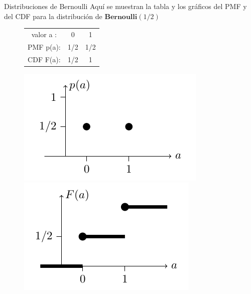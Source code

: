 \documentclass[10pt]{beamer}
\begin{document}
\begin{frame}{Distribuciones de Bernoulli}
Aqu\'i se muestran  la tabla y los gr\'aficos del PMF y del CDF para la distribuci\'on de $\textbf{Bernoulli} (1/2)$ 

\begin{figure}
	\centering
	\begin{minipage}{.5\textwidth}
	\begin{table}[]
		\centering
		\begin{tabular}{ccc}
			valor  a  :    & 0    & 1    \\
			PMF   p(a): & 1/2 & 1/2     \\
			CDF   F(a):& 1/2  &  1	
		\end{tabular}
	\end{table}
	\end{minipage}%
	\begin{minipage}{.3\textwidth}
		\centering
		\includegraphics[width=1.2\linewidth]{v9}
	\end{minipage}
		\begin{minipage}{.3\textwidth}
			\centering
			\includegraphics[width=1.2\linewidth]{v10}
		\end{minipage}
\end{figure}

\end{frame}
\end{document}
